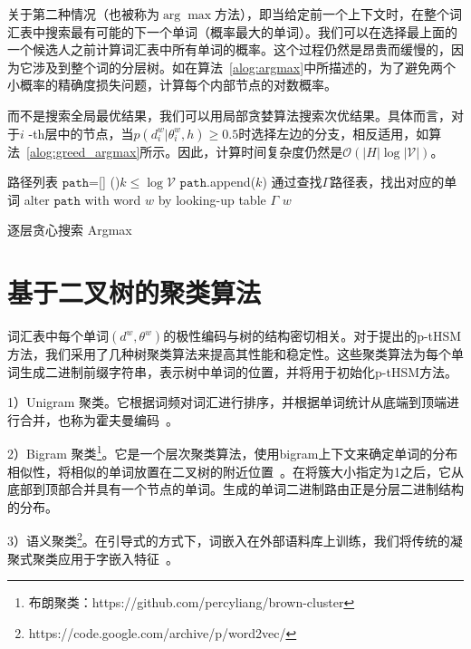 关于第二种情况（也被称为$\arg\max $方法），即当给定前一个上下文时，在整个词汇表中搜索最有可能的下一个单词（概率最大的单词）。我们可以在选择最上面的一个候选人之前计算词汇表中所有单词的概率。这个过程仍然是昂贵而缓慢的，因为它涉及到整个词的分层树。如在算法~\ref{alog:argmax}中所描述的，为了避免两个小概率的精确度损失问题，计算每个内部节点的对数概率。

而不是搜索全局最优结果，我们可以用局部贪婪算法搜索次优结果。具体而言，对于$ i $ -th层中的节点，当$ p(d ^ w_i | \theta_{i} ^ w,h)\ge 0.5 $时选择左边的分支，相反适用，如算法~\ref{alog:greed_argmax}所示。因此，计算时间复杂度仍然是$ \mathcal{O}(| H | \log \mathcal {| V |})$。


\begin{algorithm}[!ht]
\SetAlgoLined
{}
 路径列表 $\mathtt{path}$=[] \;
\While(){$k \le \log \mathcal{V}$ }{
 $\mathtt{path}$.append($k$) 
}
{通过查找$\Gamma$路径表，找出对应的单词}\;
 alter $\mathtt{path}$ with word $w$ by looking-up table $\Gamma$\;
 \Return $w$ \;
\caption{逐层贪心搜索 Argmax}\label{alog:greed_argmax}
\end{algorithm}

\section{基于二叉树的聚类算法}
词汇表中每个单词$(d^w,\theta^w)$的极性编码与树的结构密切相关。对于提出的p-tHSM方法，我们采用了几种树聚类算法来提高其性能和稳定性。这些聚类算法为每个单词生成二进制前缀字符串，表示树中单词的位置，并将用于初始化p-tHSM方法。


1）Unigram 聚类。它根据词频对词汇进行排序，并根据单词统计从底端到顶端进行合并，也称为霍夫曼编码~。

2）Bigram 聚类\footnote{布朗聚类：https://github.com/percyliang/brown-cluster}。它是一个层次聚类算法，使用bigram上下文来确定单词的分布相似性，将相似的单词放置在二叉树的附近位置~。在将簇大小指定为1之后，它从底部到顶部合并具有一个节点的单词。生成的单词二进制路由正是分层二进制结构的分布。

3）语义聚类\footnote{https://code.google.com/archive/p/word2vec/}。在引导式的方式下，词嵌入在外部语料库上训练，我们将传统的凝聚式聚类应用于字嵌入特征~。


